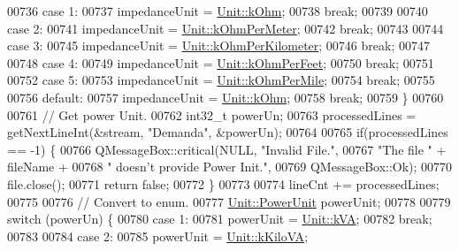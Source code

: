 \begin{DoxyCode}
00736   \textcolor{keywordflow}{case} 1:
00737     impedanceUnit = \hyperlink{class_unit_a3747e779c805df24a71961290be3fbdfa6b9c74d1763eefbaf751eeecff0bd9da}{Unit::kOhm};
00738     \textcolor{keywordflow}{break};
00739 
00740   \textcolor{keywordflow}{case} 2:
00741     impedanceUnit = \hyperlink{class_unit_a3747e779c805df24a71961290be3fbdfa35e9ca44deb5a35fdb576111cf0db336}{Unit::kOhmPerMeter};
00742     \textcolor{keywordflow}{break};
00743 
00744   \textcolor{keywordflow}{case} 3:
00745     impedanceUnit = \hyperlink{class_unit_a3747e779c805df24a71961290be3fbdfa56a0289d2ddeff7ca4aa8ba410df79d6}{Unit::kOhmPerKilometer};
00746     \textcolor{keywordflow}{break};
00747 
00748   \textcolor{keywordflow}{case} 4:
00749     impedanceUnit = \hyperlink{class_unit_a3747e779c805df24a71961290be3fbdfa433b57934ca3be960ec7a60f3ea6ea87}{Unit::kOhmPerFeet};
00750     \textcolor{keywordflow}{break};
00751 
00752   \textcolor{keywordflow}{case} 5:
00753     impedanceUnit = \hyperlink{class_unit_a3747e779c805df24a71961290be3fbdfa1d5bb04c9ecda66b09891af21cd4f613}{Unit::kOhmPerMile};
00754     \textcolor{keywordflow}{break};
00755 
00756   \textcolor{keywordflow}{default}:
00757     impedanceUnit = \hyperlink{class_unit_a3747e779c805df24a71961290be3fbdfa6b9c74d1763eefbaf751eeecff0bd9da}{Unit::kOhm};
00758     \textcolor{keywordflow}{break};
00759   \}
00760 
00761   \textcolor{comment}{// Get power Unit.}
00762   int32\_t powerUn;
00763   processedLines = getNextLineInt(&stream, \textcolor{stringliteral}{"Demanda"}, &powerUn);
00764 
00765   \textcolor{keywordflow}{if}(processedLines == -1) \{
00766     QMessageBox::critical(NULL, \textcolor{stringliteral}{"Invalid File."},
00767                           \textcolor{stringliteral}{"The file "} + fileName +
00768                           \textcolor{stringliteral}{" doesn't provide Power Init."},
00769                           QMessageBox::Ok);
00770     file.close();
00771     \textcolor{keywordflow}{return} \textcolor{keyword}{false};
00772   \}
00773 
00774   lineCnt += processedLines;
00775 
00776   \textcolor{comment}{// Convert to enum.}
00777   \hyperlink{class_unit_ace265ae255370ccacfd5370337572c3b}{Unit::PowerUnit} powerUnit;
00778 
00779   \textcolor{keywordflow}{switch} (powerUn) \{
00780   \textcolor{keywordflow}{case} 1:
00781     powerUnit = \hyperlink{class_unit_ace265ae255370ccacfd5370337572c3ba72b181a842ae2759488a2fa1410d3696}{Unit::kVA};
00782     \textcolor{keywordflow}{break};
00783 
00784   \textcolor{keywordflow}{case} 2:
00785     powerUnit = \hyperlink{class_unit_ace265ae255370ccacfd5370337572c3bac9e5154522fbb810d7aed75c3ff47cb2}{Unit::kKiloVA};

\end{DoxyCode}
